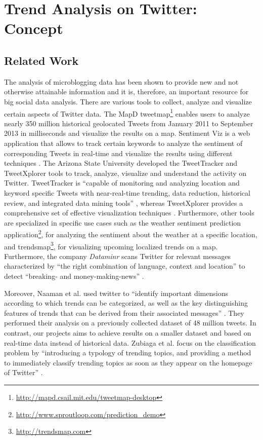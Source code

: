 
\chapter{Trend Analysis on Twitter: Concept}
\label{cha:trend-detection-concept}

\section{Related Work}
\label{sec:related-work}
The analysis of microblogging data has been shown to provide new and not otherwise attainable information and it is, therefore, an important resource for big social data analysis. There are various tools to collect, analyze and visualize certain aspects of Twitter data. The MapD tweetmap\footnote{\url{http://mapd.csail.mit.edu/tweetmap-desktop} \accessednote} enables users to analyze nearly 350 million historical geolocated Tweets from January 2011 to September 2013 in milliseconds and visualize the results on a map. Sentiment Viz is a web application that allows to track certain keywords to analyze the sentiment of corresponding Tweets in real-time and visualize the results using different techniques \cite{healy2014twittersentiment}. The Arizona State University developed the TweetTracker and TweetXplorer tools to track, analyze, visualize and understand the activity on Twitter. TweetTracker is \enquote{capable of monitoring and analyzing location and keyword specific Tweets with near-real-time trending, data reduction, historical review, and integrated data mining tools} \cite[1]{kumar2011tweettracker}, whereas TweetXplorer provides a comprehensive set of effective visualization techniques \cite{morstatter2013understanding}. Furthermore, other tools are specialized in specific use cases such as the weather sentiment prediction application\footnote{\url{http://www.sproutloop.com/prediction_demo} \accessednote}, for analyzing the sentiment about the weather at a specific location, and trendsmap\footnote{\url{http://trendsmap.com} \accessednote}, for visualizing upcoming localized trends on a map. Furthermore, the company \textit{Dataminr} scans Twitter for relevant messages characterized by \enquote{the right combination of language, context and location} to detect \enquote{breaking- and money-making-news} \cite{alcorn2013stockmarket}.

Moreover, Naaman et al. used twitter to \enquote{identify important dimensions according to which trends can be categorized, as well as the key distinguishing features of trends that can be derived from their associated messages} \cite{naaman2011characterizing}. They performed their analysis on a previously collected dataset of 48 million tweets. In contrast, our projects aims to achieve results on a smaller dataset and based on real-time data instead of historical data. Zubiaga et al. focus on the classification problem by \enquote{introducing a typology of trending topics, and providing a method to immediately classify trending topics as soon as they appear on the homepage of Twitter} \cite{zubiaga2011classifications}.

